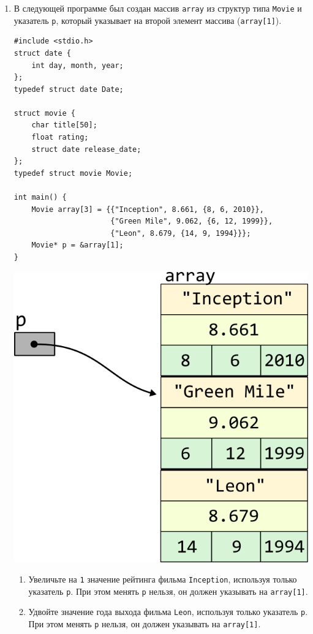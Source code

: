 \documentclass{article}
\begin{document}
\begin{enumerate}
\item В следующей программе был создан массив \texttt{array} из структур типа \texttt{Movie} и указатель \texttt{p}, который указывает на второй элемент массива (\texttt{array[1]}).
\begin{lstlisting}
#include <stdio.h>
struct date {
    int day, month, year;
};
typedef struct date Date;

struct movie {
    char title[50];
    float rating;
    struct date release_date;
};
typedef struct movie Movie;

int main() {
    Movie array[3] = {{"Inception", 8.661, {8, 6, 2010}}, 
                      {"Green Mile", 9.062, {6, 12, 1999}}, 
                      {"Leon", 8.679, {14, 9, 1994}}};
    Movie* p = &array[1];
}
\end{lstlisting}

\vspace{-59ex}
\begin{center}
\quad\quad\quad\quad\quad\quad\quad\quad\quad\quad\quad\quad\quad\quad\quad\quad\quad\quad\quad\quad\quad\quad\quad
\includegraphics[scale=1]{../images/pointer_schemes/pointer_to_array_of_struct_movie.png}
\end{center}

\begin{enumerate}
\item Увеличьте на \texttt{1} значение рейтинга фильма \texttt{Inception}, используя только указатель \texttt{p}. При этом менять \texttt{p} нельзя, он  должен указывать на \texttt{array[1]}.
\item Удвойте значение года выхода фильма \texttt{Leon}, используя только указатель \texttt{p}. При этом менять \texttt{p} нельзя, он  должен указывать на \texttt{array[1]}.
\end{enumerate}

\end{enumerate}
\end{document}
